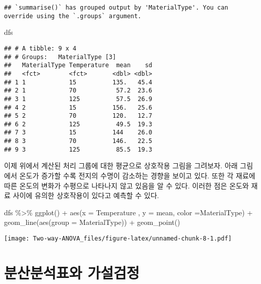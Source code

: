 \documentclass[
]{book}
\newenvironment{Shaded}{\begin{snugshade}}{\end{snugshade}}
\newcommand{\AttributeTok}[1]{\textcolor[rgb]{0.77,0.63,0.00}{#1}}
\newcommand{\FunctionTok}[1]{\textcolor[rgb]{0.00,0.00,0.00}{#1}}
\newcommand{\NormalTok}[1]{#1}
\newcommand{\SpecialCharTok}[1]{\textcolor[rgb]{0.00,0.00,0.00}{#1}}
\begin{document}
\begin{verbatim}
## `summarise()` has grouped output by 'MaterialType'. You can override using the `.groups` argument.
\end{verbatim}

\begin{Shaded}
\begin{Highlighting}[]
\NormalTok{dfs}
\end{Highlighting}
\end{Shaded}

\begin{verbatim}
## # A tibble: 9 x 4
## # Groups:   MaterialType [3]
##   MaterialType Temperature  mean    sd
##   <fct>        <fct>       <dbl> <dbl>
## 1 1            15          135.   45.4
## 2 1            70           57.2  23.6
## 3 1            125          57.5  26.9
## 4 2            15          156.   25.6
## 5 2            70          120.   12.7
## 6 2            125          49.5  19.3
## 7 3            15          144    26.0
## 8 3            70          146.   22.5
## 9 3            125          85.5  19.3
\end{verbatim}

이제 위에서 계산된 처리 그룹에 대한 평균으로 상호작용 그림을 그려보자. 아래 그림에서 온도가 증가할 수록 전지의 수명이 감소하는 경향을 보이고 있다. 또한 각 재료에 따른 온도의 변화가 수평으로 나타나지 않고 있음을 알 수 있다. 이러한 점은 온도와 재료 사이에 유의한 상호작용이 있다고 예측할 수 있다.

\begin{Shaded}
\begin{Highlighting}[]
\NormalTok{dfs }\SpecialCharTok{\%\textgreater{}\%} 
  \FunctionTok{ggplot}\NormalTok{() }\SpecialCharTok{+}
  \FunctionTok{aes}\NormalTok{(}\AttributeTok{x =}\NormalTok{ Temperature , }\AttributeTok{y =}\NormalTok{ mean, }\AttributeTok{color =}\NormalTok{MaterialType) }\SpecialCharTok{+}
  \FunctionTok{geom\_line}\NormalTok{(}\FunctionTok{aes}\NormalTok{(}\AttributeTok{group =}\NormalTok{ MaterialType)) }\SpecialCharTok{+}
  \FunctionTok{geom\_point}\NormalTok{()}
\end{Highlighting}
\end{Shaded}

\texttt{[image: Two-way-ANOVA\_files/figure-latex/unnamed-chunk-8-1.pdf]}

\hypertarget{uxbd84uxc0b0uxbd84uxc11duxd45cuxc640-uxac00uxc124uxac80uxc815}{%
\section{분산분석표와 가설검정}\label{uxbd84uxc0b0uxbd84uxc11duxd45cuxc640-uxac00uxc124uxac80uxc815}}
\end{document}
